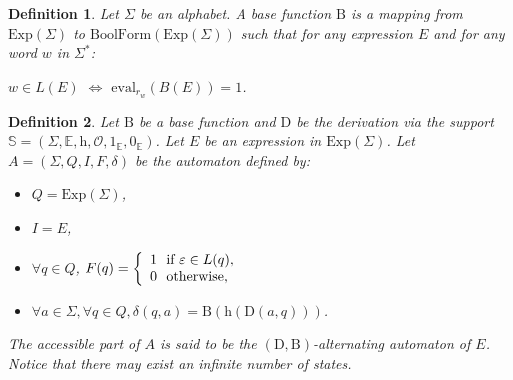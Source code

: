 \documentclass{article}
\newtheorem{definition}{Definition}
\begin{document}
  
  \begin{definition}\label{def base}
    Let $\Sigma$ be an alphabet. A \emph{base function} $\mathrm{B}$ is a mapping from $\mathrm{Exp}(\Sigma)$ to $\mathrm{BoolForm}(\mathrm{Exp}(\Sigma))$ such that for any expression $E$ and for any word $w$ in $\Sigma^{*}$:
    
    \centerline{$w\in L(E)$ $\Leftrightarrow$ $\mathrm{eval}_{r_w}(B(E))=1$.}
  \end{definition}
  
  \begin{definition}
    Let $\mathrm{B}$ be a base function and $\mathrm{D}$ be the derivation \emph{via} the support $\mathbb{S}=(\Sigma,\mathbb{E},\mathrm{h},\mathcal{O},1_\mathbb{E},0_\mathbb{E})$. Let $E$ be an expression in $\mathrm{Exp}(\Sigma)$. Let $A=(\Sigma,Q,I,F,\delta)$ be the automaton defined by:
    
    \begin{itemize}
      \item $Q=\mathrm{Exp}(\Sigma)$,
      \item $I=E$,
      \item $\forall q\in Q$, 
        $F(q)=
          \left\{
            \begin{array}{l@{\ }l}
              1 & \text{ if }\varepsilon\in L(q),\\
              0 & \text{ otherwise,}
            \end{array}
          \right.
        $
      \item $\forall a\in\Sigma, \forall q\in Q, \delta(q,a)=\mathrm{B}(\mathrm{h}(\mathrm{D}(a,q)))$.
    \end{itemize}
    
    The accessible part of $A$ is said to be the $(\mathrm{D},\mathrm{B})$-\emph{alternating automaton of} $E$. Notice that there may exist an infinite number of states.
  \end{definition}
  
\end{document}
